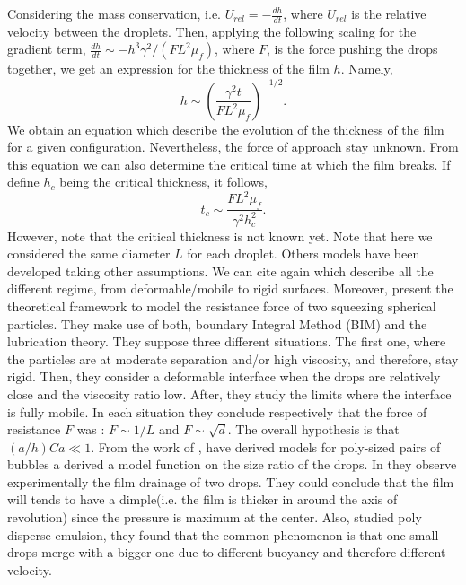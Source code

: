 Considering the mass conservation, i.e. $U_{rel} = -\frac{dh}{dt}$, where $U_{rel}$ is the relative velocity between the droplets. 
Then, applying the following scaling for the gradient term, $\frac{dh}{dt}\sim -h^3\gamma^2/(FL^2\mu_f)$, where $F$, is the force pushing the drops together, we get an expression for the thickness of the film $h$.
Namely, 
\begin{equation*}
    h \sim \left(\frac{\gamma^2t}{FL^2\mu_f}\right)^{-1/2}.
\end{equation*}
We obtain an equation which describe the evolution of the thickness of the film for a given configuration. 
Nevertheless, the force of approach stay unknown.
From this equation we can also determine the critical time at which the film breaks.
If define $h_c$ being the critical thickness, it follows,
\begin{equation}
    t_c \sim \frac{FL^2\mu_f}{\gamma^2h_c^2}.
\end{equation} 
However, note that the critical thickness is not known yet.
Note that here we considered the same diameter $L$ for each droplet. 
Others models have been developed taking other assumptions. 
We can cite again \citet{chesters1991modelling} which describe all the different regime, from deformable/mobile to rigid surfaces. 
Moreover, \cite{davis1989lubrication} present the theoretical framework to model the resistance force of two squeezing spherical particles.
They make use of both, boundary Integral Method  (BIM) \citep{pozrikidis1992boundary} and the lubrication theory.   
They suppose three different situations. 
The first one, where the particles are at moderate separation and/or high viscosity, and therefore, stay rigid. 
Then, they consider a deformable interface when the drops are relatively close and the viscosity ratio low. 
After, they study the limits where the interface is fully mobile.  
In each situation they conclude respectively that the force of resistance $F$ was :
$F\sim 1/L$ and  $F \sim \sqrt{d}$. 
The overall hypothesis is that $(a/h) Ca\ll 1$.
From the work of \citet{chesters1991modelling}, \citet{KAMP20011363} have derived models for poly-sized pairs of bubbles a derived a model function on the size ratio of the drops.
In \cite{leal2004flow} they observe experimentally the film drainage of two drops. 
They could conclude that the film will tends to have a dimple(i.e. the film is thicker in around the axis of revolution)  since the pressure is maximum at the center. 
Also, \citet{yiantsios1990buoyancy} studied poly disperse emulsion, they found that  the common phenomenon is that one small drops merge with a bigger one due to different buoyancy and therefore different velocity. 
